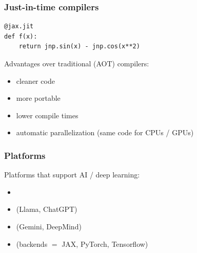 \begin{frame}[fragile]
    \frametitle{Just-in-time compilers}

    \vspace{0.5em}
    
    \begin{verbatim}
@jax.jit
def f(x):
    return jnp.sin(x) - jnp.cos(x**2)
    \end{verbatim}

    \vspace{0.5em}
    \vspace{0.5em}
    Advantages over traditional (AOT) compilers:

    \begin{itemize}
        \item cleaner code
    \vspace{0.5em}
        \item more portable
    \vspace{0.5em}
        \item lower compile times
    \vspace{0.5em}
        \item automatic parallelization (same code for CPUs / GPUs)
    \end{itemize}

\end{frame}



\begin{frame}
    \frametitle{Platforms}
    
    Platforms that support AI / deep learning:

    \vspace{0.5em}
    \begin{itemize}
        \item {}
        \vspace{0.5em}
        \item {} (Llama, ChatGPT)
        \vspace{0.5em}
        \item {} (Gemini, DeepMind)
        \vspace{0.5em}
        \item {} (backends $=$ JAX, PyTorch, Tensorflow)
    \end{itemize}

\end{frame}


